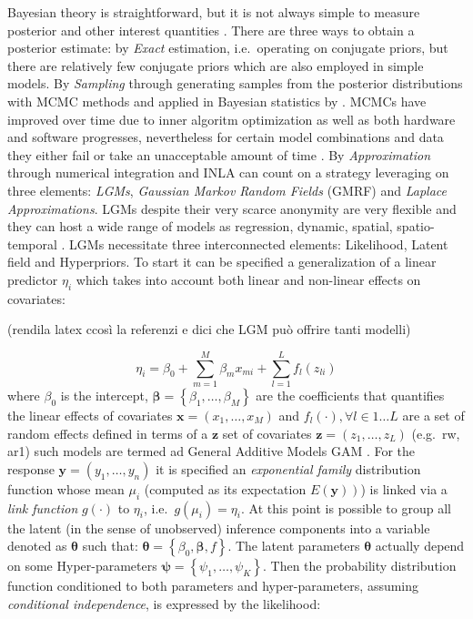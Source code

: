 \documentclass[
  12pt,
  a4paper,
  oneside]{book}
\theoremstyle{definition}
\theoremstyle{definition}
\theoremstyle{definition}
\theoremstyle{remark}
\begin{document}
Bayesian theory is straightforward, but it is not always simple to measure posterior and other interest quantities \citep{wang2018bayesian}. There are three ways to obtain a posterior estimate: by \emph{Exact} estimation, i.e.~operating on conjugate priors, but there are relatively few conjugate priors which are also employed in simple models. By \emph{Sampling} through generating samples from the posterior distributions with MCMC methods \citep{hastings, metropolis} and applied in Bayesian statistics by \citet{gelfand1990sampling}. MCMCs have improved over time due to inner algoritm optimization as well as both hardware and software progresses, nevertheless for certain model combinations and data they either fail or take an unacceptable amount of time \citeyearpar{wang2018bayesian}. By \emph{Approximation} through numerical integration and INLA can count on a strategy leveraging on three elements: \emph{LGMs}, \emph{Gaussian Markov Random Fields} (GMRF) and \emph{Laplace Approximations}. LGMs despite their very scarce anonymity are very flexible and they can host a wide range of models as regression, dynamic, spatial, spatio-temporal \citep{Cameletti2012}. LGMs necessitate three interconnected elements: Likelihood, Latent field and Hyperpriors.
To start it can be specified a generalization of a linear predictor \(\eta_{i}\) which takes into account both linear and non-linear effects on covariates:

(rendila latex ccosì la referenzi e dici che LGM può offrire tanti modelli)

\[
\eta_{i}=\beta_{0}+\sum_{m=1}^{M} \beta_{m} x_{m i}+\sum_{l=1}^{L} f_{l}\left(z_{l i}\right)
\]
where \(\beta_{0}\) is the intercept, \(\boldsymbol{\beta}=\left\{\beta_{1}, \ldots, \beta_{M}\right\}\) are the coefficients that quantifies the linear effects of covariates \(\boldsymbol{x}=\left({x}_{1}, \ldots, {x}_{M}\right)\) and \(f_{l}(\cdot), \forall l \in 1 \ldots L\) are a set of random effects defined in terms of a \(\boldsymbol{z}\) set of covariates \(\boldsymbol{z}=\left(z_{1}, \ldots, z_{L}\right)\) (e.g.~rw, ar1) \citep{Blangiardo-Cameletti} such models are termed ad General Additive Models GAM \citep{wang2018bayesian}.
For the response \(\mathbf{y}=\left(y_{1}, \ldots, y_{n}\right)\) it is specified an \emph{exponential family} distribution function whose mean \(\mu_i\) (computed as its expectation \(\left.E\left(\mathbf{y}\right)\right)\)) is linked via a \emph{link function} \(g(\cdot)\) to \(\eta_{i}\), i.e.~\(g\left(\mu_i\right)=\eta_{i}\). At this point is possible to group all the latent (in the sense of unobserved) inference components into a variable denoted as \(\boldsymbol{\theta}\) such that: \(\boldsymbol{\theta}=\left\{\beta_{0}, \boldsymbol{\beta}, f\right\}\). The latent parameters \(\boldsymbol{\theta}\) actually depend on some Hyper-parameters \(\boldsymbol{\psi} = \left\{\psi_{1}, \ldots, \psi_{K}\right\}\). Then the probability distribution function conditioned to both parameters and hyper-parameters, assuming \emph{conditional independence}, is expressed by the likelihood:
\end{document}
